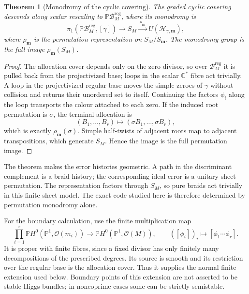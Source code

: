 \documentclass[11pt]{article}
\newtheorem{theorem}{Theorem}[section]
\theoremstyle{definition}
\theoremstyle{remark}
\newcommand{\C}{\mathbb C}
\newcommand{\Pp}{\mathbb P}
\newcommand{\cH}{\mathcal H}
\newcommand{\cB}{\mathcal B}
\newcommand{\cO}{\mathcal O}
\newcommand{\reg}{\mathrm{reg}}
\begin{document}
\begin{theorem}[Monodromy of the cyclic covering]\label{thm:monodromy}
The graded cyclic covering descends along scalar rescaling to $\Pp\cB_M^{\reg}$, where its monodromy is
\begin{equation}\label{eq:monodromy-factorization}
 \pi_1(\Pp\cB_M^{\reg},[\gamma])
 \longrightarrow S_M
 \xrightarrow{\ \rho_{\boldsymbol m}\ }
 U(\cH_{\gamma,\boldsymbol m}),
\end{equation}
where $\rho_{\boldsymbol m}$ is the permutation representation on $S_M/S_{\boldsymbol m}$.  The monodromy group is the full image $\rho_{\boldsymbol m}(S_M)$.
\end{theorem}

\begin{proof}
The allocation cover depends only on the zero divisor, so over $\cB_M^{\reg}$ it is pulled back from the projectivized base; loops in the scalar $\C^*$ fibre act trivially.  A loop in the projectivized regular base moves the simple zeroes of $\gamma$ without collision and returns their unordered set to itself.  Continuing the factors $\phi_i$ along the loop transports the colour attached to each zero.  If the induced root permutation is $\sigma$, the terminal allocation is
\[
 (B_1,\ldots,B_r)\longmapsto
 (\sigma B_1,\ldots,\sigma B_r),
\]
which is exactly $\rho_{\boldsymbol m}(\sigma)$.  Simple half-twists of adjacent roots map to adjacent transpositions, which generate $S_M$.  Hence the image is the full permutation image.
\end{proof}

The theorem makes the error histories geometric.  A path in the discriminant complement is a braid history; the corresponding ideal error is a unitary sheet permutation.  The representation factors through $S_M$, so pure braids act trivially in this finite sheet model.  The exact code studied here is therefore determined by permutation monodromy alone.

For the boundary calculation, use the finite multiplication map
\begin{equation}\label{eq:allocation-completion}
 \prod_{i=1}^r\Pp H^0(\Pp^1,\cO(m_i))
 \longrightarrow\Pp H^0(\Pp^1,\cO(M)),
 \qquad ([\phi_i])_i\longmapsto[\phi_1\cdots\phi_r].
\end{equation}
It is proper with finite fibres, since a fixed divisor has only finitely many decompositions of the prescribed degrees.  Its source is smooth and its restriction over the regular base is the allocation cover.  Thus it supplies the normal finite extension used below.  Boundary points of this extension are not asserted to be stable Higgs bundles; in noncoprime cases some can be strictly semistable.
\end{document}
